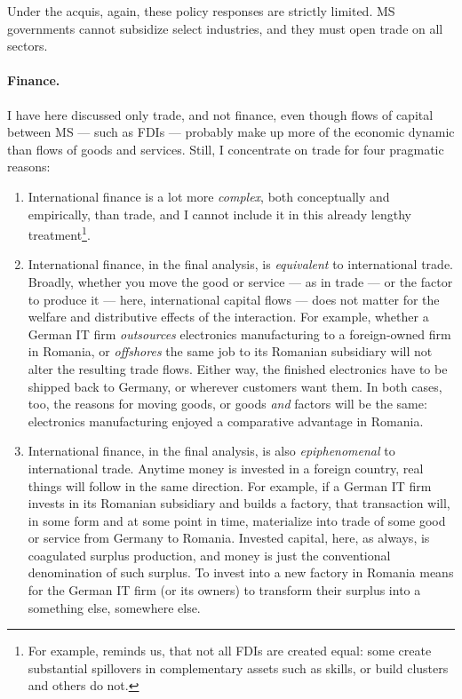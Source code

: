 Under the acquis, again, these policy responses are strictly limited.
\gls{MS} governments cannot subsidize select industries, and they must open trade on all sectors.

\paragraph{Finance.} I have here discussed only trade, and not finance, even though flows of capital between \gls{MS} --- such as \glspl{FDI} --- probably make up more of the economic dynamic than flows of goods and services.
Still, I concentrate on trade for four pragmatic reasons:
\begin{enumerate}
	\item International finance is a lot more \emph{complex}, both conceptually and empirically, than trade, and I cannot include it in this already lengthy treatment\footnote{
		For example, \cite{Narula2005} reminds us, that not all \glspl{FDI} are created equal:
some create substantial spillovers in complementary assets such as skills, or build clusters and others do not.}.
	\item International finance, in the final analysis, is \emph{equivalent} to international trade.
Broadly, whether you move the good or service --- as in trade --- or the factor to produce it --- here, international capital flows --- does not matter for the welfare and distributive effects of the interaction.
For example, whether a German IT firm \emph{outsources} electronics manufacturing to a foreign-owned firm in Romania, or \emph{offshores} the same job to its Romanian subsidiary will not alter the resulting trade flows.
Either way, the finished electronics have to be shipped back to Germany, or wherever customers want them.
In both cases, too, the reasons for moving goods, or goods \emph{and} factors will be the same:
electronics manufacturing enjoyed a comparative advantage in Romania.
	\item International finance, in the final analysis, is also \emph{epiphenomenal} to international trade.
Anytime money is invested in a foreign country, real things will follow in the same direction.
For example, if a German IT firm invests in its Romanian subsidiary and builds a factory, that transaction will, in some form and at some point in time, materialize into trade of some good or service from Germany to Romania.
Invested capital, here, as always, is coagulated surplus production, and money is just the conventional denomination of such surplus.
To invest into a new factory in Romania means for the German IT firm (or its owners) to transform their surplus into a something else, somewhere else.

\end{enumerate}
